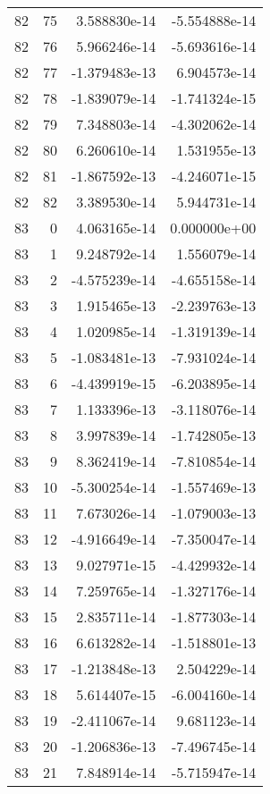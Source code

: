 \begin{tabular}{rrrr}
  82 &   75 &  3.588830e-14 & -5.554888e-14 \\
  82 &   76 &  5.966246e-14 & -5.693616e-14 \\
  82 &   77 & -1.379483e-13 &  6.904573e-14 \\
  82 &   78 & -1.839079e-14 & -1.741324e-15 \\
  82 &   79 &  7.348803e-14 & -4.302062e-14 \\
  82 &   80 &  6.260610e-14 &  1.531955e-13 \\
  82 &   81 & -1.867592e-13 & -4.246071e-15 \\
  82 &   82 &  3.389530e-14 &  5.944731e-14 \\
  83 &    0 &  4.063165e-14 &  0.000000e+00 \\
  83 &    1 &  9.248792e-14 &  1.556079e-14 \\
  83 &    2 & -4.575239e-14 & -4.655158e-14 \\
  83 &    3 &  1.915465e-13 & -2.239763e-13 \\
  83 &    4 &  1.020985e-14 & -1.319139e-14 \\
  83 &    5 & -1.083481e-13 & -7.931024e-14 \\
  83 &    6 & -4.439919e-15 & -6.203895e-14 \\
  83 &    7 &  1.133396e-13 & -3.118076e-14 \\
  83 &    8 &  3.997839e-14 & -1.742805e-13 \\
  83 &    9 &  8.362419e-14 & -7.810854e-14 \\
  83 &   10 & -5.300254e-14 & -1.557469e-13 \\
  83 &   11 &  7.673026e-14 & -1.079003e-13 \\
  83 &   12 & -4.916649e-14 & -7.350047e-14 \\
  83 &   13 &  9.027971e-15 & -4.429932e-14 \\
  83 &   14 &  7.259765e-14 & -1.327176e-14 \\
  83 &   15 &  2.835711e-14 & -1.877303e-14 \\
  83 &   16 &  6.613282e-14 & -1.518801e-13 \\
  83 &   17 & -1.213848e-13 &  2.504229e-14 \\
  83 &   18 &  5.614407e-15 & -6.004160e-14 \\
  83 &   19 & -2.411067e-14 &  9.681123e-14 \\
  83 &   20 & -1.206836e-13 & -7.496745e-14 \\
  83 &   21 &  7.848914e-14 & -5.715947e-14 \\

\end{tabular}
